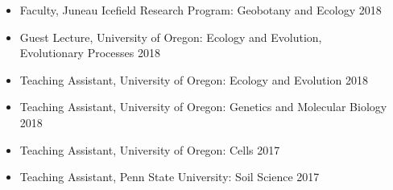 \documentclass[10pt]{article}
\newenvironment{innerlist}[1][\enskip\textbullet]%
        {\begin{itemize}[#1,leftmargin=*,parsep=0pt,itemsep=0pt,topsep=0pt,partopsep=0pt]}
        {\end{itemize}}
\begin{document}
\begin{innerlist}
\item[] Faculty, Juneau Icefield Research Program: Geobotany and Ecology
	\hfill 2018
\item[] Guest Lecture, University of Oregon: Ecology and Evolution, \\
  Evolutionary Processes \hfill 2018
\item[] Teaching Assistant, University of Oregon: Ecology and Evolution
	\hfill 2018
\item[] Teaching Assistant, University of Oregon: Genetics and
	Molecular Biology \hfill 2018
\item[] Teaching Assistant, University of Oregon: Cells \hfill 2017
\item[] Teaching Assistant, Penn State University: Soil Science \hfill
	2017

\end{innerlist}
\end{document}
